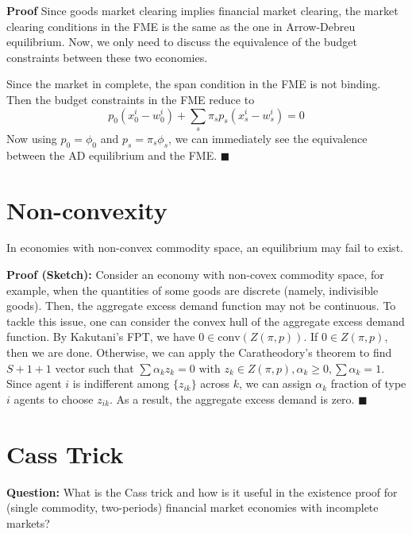 \noindent \textbf{Proof}
Since goods market clearing implies financial market clearing, the market clearing conditions in 
the FME is the same as the one in Arrow-Debreu equilibrium.
Now, we only need to discuss the equivalence of the budget constraints between these two economies.

Since the market in complete, the span condition in the FME is not binding.
Then the budget constraints in the FME reduce to
\[
p_0 (x_0^i - w_0^i) + \sum_s \pi_s p_s (x_s^i - w_s^i) = 0
\]
Now using $p_0 = \phi_0$ and $p_s = \pi_s \phi_s$,
we can immediately see the equivalence between the AD equilibrium and the FME. \(\blacksquare\)



\section{Non-convexity}
\begin{tcolorbox}
  \begin{proposition}
    In economies with non-convex commodity space, 
    an equilibrium may fail to exist.
  \end{proposition}
\end{tcolorbox}
\noindent \textbf{Proof (Sketch):}
Consider an economy with non-covex commodity space, 
for example, when the quantities of some goods are discrete (namely, indivisible goods).
Then, the aggregate excess demand function may not be continuous.
To tackle this issue, one can consider the convex hull of the aggregate excess demand function.
By Kakutani's FPT, we have $0 \in \text{conv}(Z(\pi, p))$.
If $0 \in Z(\pi, p)$, then we are done.
Otherwise, we can apply the Caratheodory's theorem to find $S+1 +1$ vector such that 
$\sum \alpha_k z_k = 0 \text{ with } z_k \in Z(\pi, p), \alpha_k \geq 0, \sum \alpha_k = 1$.
Since agent $i$ is indifferent among $\{z_{ik}\}$ across $k$,
we can assign $\alpha_k$ fraction of type $i$ agents to choose $z_{ik}$.
As a result, the aggregate excess demand is zero. \(\blacksquare\)


\section{Cass Trick}
\textbf{Question:}  What is the Cass trick and how is it useful in the existence proof for 
(single commodity, two-periods) financial market economies with incomplete markets?

